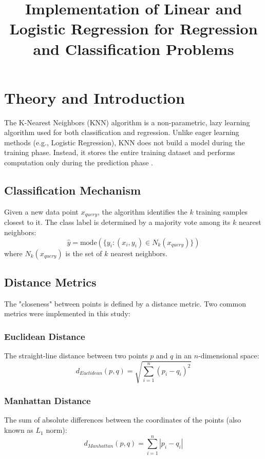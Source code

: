 \documentclass[11pt]{article}
\title{Implementation of Linear and Logistic Regression for Regression and Classification Problems}
\author{}
\date{}
\begin{document}


\pagebreak

\tableofcontents

\pagebreak
{}
\maketitle

\section{Theory and Introduction}
The K-Nearest Neighbors (KNN) algorithm is a non-parametric, lazy learning algorithm used for both classification and regression. Unlike eager learning methods (e.g., Logistic Regression), KNN does not build a model during the training phase. Instead, it stores the entire training dataset and performs computation only during the prediction phase \cite{bishop2006pattern}.

\subsection{Classification Mechanism}
Given a new data point $x_{query}$, the algorithm identifies the $k$ training samples closest to it. The class label is determined by a majority vote among its $k$ nearest neighbors:
\begin{equation}
    \hat{y} = \text{mode}(\{ y_i : (x_i, y_i) \in N_k(x_{query}) \})
\end{equation}
where $N_k(x_{query})$ is the set of $k$ nearest neighbors.

\subsection{Distance Metrics}
The "closeness" between points is defined by a distance metric. Two common metrics were implemented in this study:

\subsubsection*{Euclidean Distance}
The straight-line distance between two points $p$ and $q$ in an $n$-dimensional space:
\begin{equation}
    d_{Euclidean}(p, q) = \sqrt{\sum_{i=1}^{n} (p_i - q_i)^2}
\end{equation}

\subsubsection*{Manhattan Distance}
The sum of absolute differences between the coordinates of the points (also known as $L_1$ norm):
\begin{equation}
    d_{Manhattan}(p, q) = \sum_{i=1}^{n} |p_i - q_i|
\end{equation}
\end{document}
